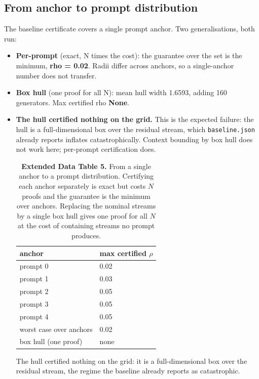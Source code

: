 \documentclass[sn-nature,pdflatex]{sn-jnl}
\begin{document}
\subsection{From anchor to prompt distribution}
The baseline certificate covers a single prompt anchor. Two generalisations, both run:
\begin{itemize}
\item \textbf{Per-prompt} (exact, N times the cost): the guarantee over the set is the minimum, \textbf{rho = 0.02}. Radii differ across anchors, so a single-anchor number does not transfer.
\item \textbf{Box hull} (one proof for all N): mean hull width 1.6593, adding 160 generators. Max certified rho \textbf{None}.
\item \textbf{The hull certified nothing on the grid.} This is the expected failure: the hull is a full-dimensional box over the residual stream, which \texttt{baseline.json} already reports inflates catastrophically. Context bounding by box hull does not work here; per-prompt certification does.

\begin{table}[t]
\centering
\caption*{\textbf{Extended Data Table 5.} From a single anchor to a prompt distribution. Certifying each anchor separately is exact but costs $N$ proofs and the guarantee is the minimum over anchors. Replacing the nominal streams by a single box hull gives one proof for all $N$ at the cost of containing streams no prompt produces.}
\label{edtab:distribution}
\begin{tabular}{l l}
\toprule
anchor & {max certified $\rho$} \\
\midrule
prompt 0 & 0.02 \\
prompt 1 & 0.03 \\
prompt 2 & 0.05 \\
prompt 3 & 0.05 \\
prompt 4 & 0.05 \\
\midrule
worst case over anchors & 0.02 \\
box hull (one proof) & {none} \\
\bottomrule
\end{tabular}
\par\vspace{2pt}\noindent\footnotesize The hull certified nothing on the grid: it is a full-dimensional box over the residual stream, the regime the baseline already reports as catastrophic.
\end{table}

\end{itemize}
\end{document}
